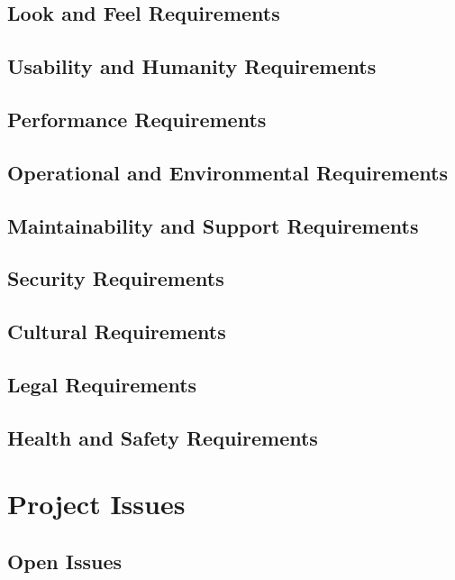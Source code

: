 \documentclass[11pt]{article}
\begin{document}
\subsection{Look and Feel Requirements}

\subsection{Usability and Humanity Requirements}

\subsection{Performance Requirements}

\subsection{Operational and Environmental Requirements}

\subsection{Maintainability and Support Requirements}

\subsection{Security Requirements}

\subsection{Cultural Requirements}

\subsection{Legal Requirements}

\subsection{Health and Safety Requirements}

\section{Project Issues}

\subsection{Open Issues}
\end{document}
